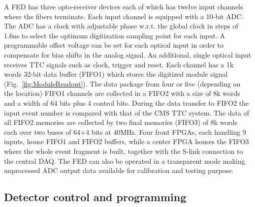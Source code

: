 A FED has three opto-receiver devices each of which has twelve input channels where the fibers terminate. Each input channel is equipped with a 10-bit ADC.
The ADC has a clock with adjustable phase w.r.t. the global clock in steps of 1.6\unit{ns} to select the optimum digitization sampling point for each input.
A programmable offset voltage can be set for each optical input in order to compensate for bias shifts in the analog signal.
An additional, single optical input receives TTC signals such as clock, trigger and reset.
Each channel has a 1k words 32-bit data buffer (FIFO1) which stores the digitized module signal (Fig.~\ref{fig:ModuleReadout}).
The data package from four or five (depending on the location) FIFO1 channels are collected in a FIFO2 with a size of 8k words and a width of 64 bits plus 4 control bits.
During the data transfer to FIFO2 the input event number is compared with that of the CMS TTC system.
The data of all FIFO2 memories are collected by two final memories (FIFO3) of 8k words each over two buses of 64+4 bits at 40\unit{MHz}. 
Four front FPGAs, each handling 9 inputs, house FIFO1 and FIFO2 buffers, while a center FPGA houses the FIFO3 where the whole event fragment is built,
together with the S-link connection to the central DAQ.
The FED can also be operated in a transparent mode making unprocessed ADC output data available for calibration and testing purpose. 

\subsection{Detector control and programming}


